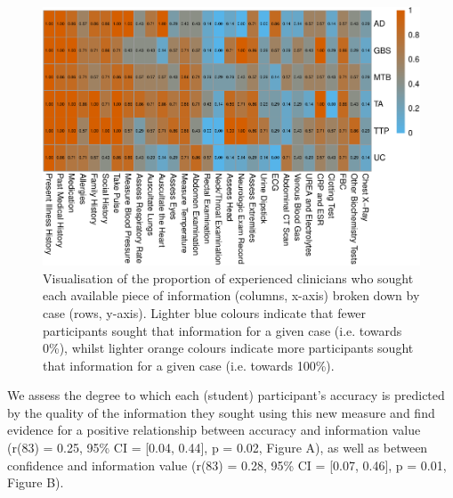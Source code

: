 \documentclass[a4paper, nobind]{templates/ociamthesis}
\begin{document}
\begin{figure}[H]

{\centering \includegraphics[width=1\linewidth]{_main_files/figure-latex/infoPropsExp-1} 

}

\caption[Online Study Appendix: Expert Information Seeking by Case (Heatmap)]{Visualisation of the proportion of experienced clinicians who sought each available piece of information (columns, x-axis) broken down by case (rows, y-axis). Lighter blue colours indicate that fewer participants sought that information for a given case (i.e. towards 0\%), whilst lighter orange colours indicate more participants sought that information for a given case (i.e. towards 100\%).}\label{fig:infoPropsExp}
\end{figure}

We assess the degree to which each (student) participant's accuracy is predicted by the quality of the information they sought using this new measure and find evidence for a positive relationship between accuracy and information value (r(83) = 0.25, 95\% CI = {[}0.04, 0.44{]}, p = 0.02, Figure A), as well as between confidence and information value (r(83) = 0.28, 95\% CI = {[}0.07, 0.46{]}, p = 0.01, Figure B).

\newpage
\end{document}
